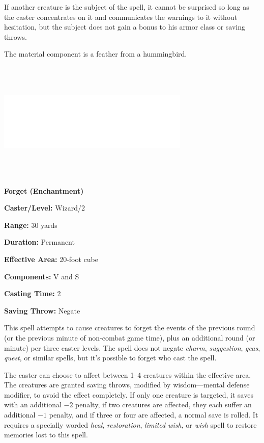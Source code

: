 \begin{multicols}{2}
If another creature is the subject of the spell, it cannot be surprised so long as the caster concentrates on it and communicates the warnings to it without hesitation, but the subject does not gain a bonus to his armor class or saving throws.

The material component is a feather from a hummingbird.

\noindent\includegraphics[width=3.6in, height=2.25in]{testblock.pdf}


\vspace{1em}

\noindent
\begin{minipage}{\columnwidth}

\noindent \textbf{Forget (Enchantment)}

\noindent \textbf{Caster/Level:} Wizard/2

\noindent \textbf{Range:} 30 yards

\noindent \textbf{Duration:} Permanent

\noindent \textbf{Effective Area:} 20-foot cube

\noindent \textbf{Components:} V and S

\noindent \textbf{Casting Time:} 2

\noindent \textbf{Saving Throw:} Negate

\end{minipage}

This spell attempts to cause creatures to forget the events of the previous round (or the previous minute of non-combat game time), plus an additional round (or minute) per three caster levels.  The spell does not negate \textit{charm}, \textit{suggestion}, \textit{geas}, \textit{quest}, or similar spells, but it's possible to forget who cast the spell.  

The caster can choose to affect between 1--4 creatures within the effective area.  The creatures are granted saving throws, modified by wisdom---mental defense modifier, to avoid the effect completely.  If only one creature is targeted, it saves with an additional $-2$ penalty, if two creatures are affected, they each suffer an additional $-1$ penalty, and if three or four are affected, a normal save is rolled.  It requires a specially worded \textit{heal}, \textit{restoration}, \textit{limited wish}, or \textit{wish} spell to restore memories lost to this spell.


\end{multicols}
